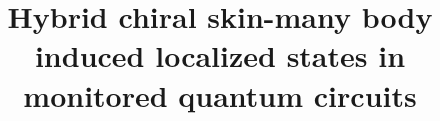 \documentclass[longbibliography, aps, prx, amsmath, amssymb, amsfonts, twocolumn,superscriptaddress, footinbib]{revtex4-1}
\begin{document}
	
	
	\title{Hybrid chiral skin-many body induced localized states in monitored quantum circuits}

	


\end{document}
